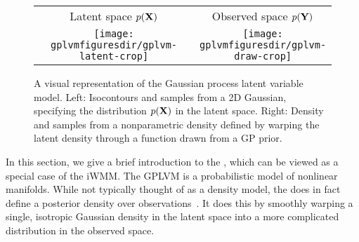 \begin{figure}
\begin{centering}
{\begin{tabular}{cccc}
\phantom{h} & Latent space $p(\mathbf{X})$ & & Observed space $p(\mathbf{Y})$ \\
& \fbox{\texttt{[image: \\gplvmfiguresdir/gplvm-latent-crop]}} &
\raisebox{7em}{$\overset{\mathlarger{f(x)}}{\mathlarger{\mathlarger{\mathlarger{\mathlarger{\mathlarger{\mathlarger{\mathlarger{\rightarrow}}}}}}}}$} &
\fbox{\texttt{[image: \\gplvmfiguresdir/gplvm-draw-crop]}}
\end{tabular}}
\end{centering}
\caption[Two-dimensional Gaussian process latent variable model]{A visual representation of the Gaussian process latent variable model.  Left:  Isocontours and samples from a 2D Gaussian, specifying the distribution $p(\mathbf{X})$ in the latent space.  Right: Density and samples from a nonparametric density defined by warping the latent density through a function drawn from a GP prior.}  
\label{fig:twod-gplvm}
\end{figure}



In this section, we give a brief introduction to the \gplvm{}, which can be viewed as a special case of the iWMM.
The GPLVM is a probabilistic model of nonlinear manifolds.
While not typically thought of as a density model, the \gplvm{} does in fact define a posterior density over observations~\cite{nickisch2010gaussian}.
It does this by smoothly warping a single, isotropic Gaussian density in the latent space into a more complicated distribution in the observed space.  


